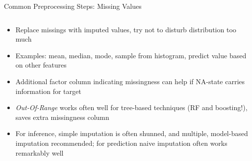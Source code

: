 \begin{frame}{Common Preprocessing Steps: Missing Values}
\begin{columns}
			\begin{column}{0.7\textwidth}
				\begin{itemize}
					\item Replace missings with imputed values, try not to 
					disturb distribution too much
					\item Examples: mean, median, mode, sample from histogram,
					predict value based on other features
					\pause
					\item Additional factor column indicating missingness can help
					if NA-state carries information for target
					\item \emph{Out-Of-Range} works often well for tree-based techniques
					(RF and boosting!), saves extra missingness column
					\pause
					\item For inference, simple imputation is often shunned, 
					and multiple, model-based imputation recommended; 
					for prediction naive imputation often works remarkably well
					
				\end{itemize}
			\end{column}%

		\end{columns}
	\end{frame}
	
